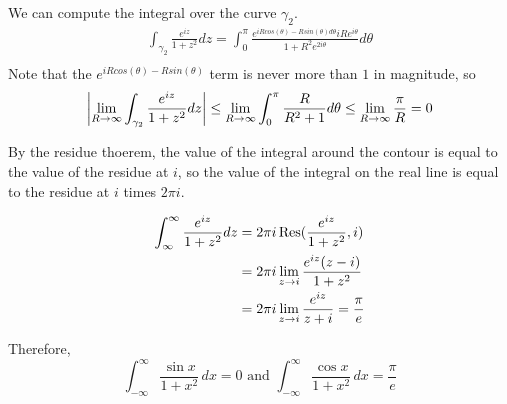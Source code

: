 \documentclass{homework}
\begin{document}
\begin{solution}
                                                  We can compute the integral over the curve $\gamma_2$.
                                                  \begin{align*}
                                                  \int_{\gamma_2} \frac{e^{iz}}{1+z^2}dz  = \int_0^\pi \frac{e^{iRcos(\theta) - Rsin(\theta)d\theta}iRe^{i\theta}}{1+R^2e^{2i\theta}}d\theta\\
                                                  \end{align*}
                                                  Note that the $e^{iRcos(\theta) - Rsin(\theta)}$ term is never more than $1$ in magnitude, so
                                                  \begin{align*}
                                                  \left|\lim_{R\to\infty} \int_{\gamma_2} \frac{e^{iz}}{1+z^2}dz\right| \leq \lim_{R\to\infty} \int_0^\pi \frac{R}{R^2+1}d\theta \leq \lim_{R\to\infty} \frac{\pi}{R} = 0
                                                  \end{align*}

                                                  By the residue thoerem, the value of the integral around the contour is equal to the value of the residue at $i$, so the value of the integral on the real line is equal to the residue at $i$ times $2\pi i$.

                                                  \begin{align*}
                                                  \int_\infty^\infty \frac{e^{iz}}{1+z^2} dz &= 2\pi i \operatorname{Res}(\frac{e^{iz}}{1+z^2}, i)\\
                                                  &= 2\pi i\lim_{z\to i} \frac{e^{iz}(z-i)}{1+z^2} \\
                                                  &= 2\pi i\lim_{z\to i} \frac{e^{iz}}{z+i} = \frac{\pi}{e}
                                                  \end{align*}

                                                  Therefore, 
                                                    \[
                                                        \int_{-\infty}^\infty \frac{\sin x}{1+x^2} \, dx = 0 \mbox{ and }
                                                            \int_{-\infty}^\infty \frac{\cos x}{1+x^2} \, dx =  \frac{\pi}{e}
                                                              \] 
                                                              \end{solution}
\end{document}
